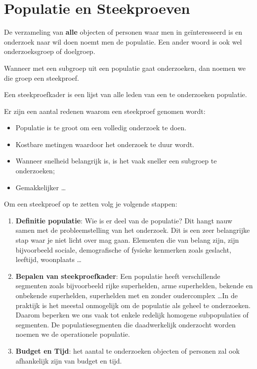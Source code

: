 \section{Populatie en Steekproeven}
\begin{definition}[Populatie]
  De verzameling van \textbf{alle} objecten of personen waar men in ge\"interesseerd is en onderzoek naar wil doen noemt men de  populatie. Een ander woord is ook wel onderzoeksgroep of doelgroep.
\end{definition}

\begin{definition}[Steekproef]
  Wanneer met een subgroep uit een populatie gaat onderzoeken, dan noemen we die groep een  steekproef.
\end{definition}

\begin{definition}[Steekproefkader]
  Een  steekproefkader is een lijst van alle leden van een te onderzoeken populatie.
\end{definition}

Er zijn een aantal redenen waarom een steekproef genomen wordt:
\begin{itemize}
  \item Populatie is te groot om een volledig onderzoek te doen.
  \item Kostbare metingen waardoor het onderzoek te duur wordt.
  \item Wanneer snelheid belangrijk is, is het vaak sneller een subgroep te onderzoeken;
  \item Gemakkelijker \dots
\end{itemize}

Om een steekproef op te zetten volg je volgende stappen:
\begin{enumerate}
  \item \textbf{Definitie populatie}: Wie is er deel van de populatie? Dit hangt nauw samen met de probleemstelling van het onderzoek. Dit is een zeer belangrijke stap waar je niet licht over mag gaan. Elementen die van belang zijn, zijn bijvoorbeeld sociale, demografische of fysieke kenmerken zoals geslacht, leeftijd, woonplaats \dots
  \item \textbf{Bepalen van steekproefkader}: Een populatie heeft verschillende segmenten zoals bijvoorbeeld rijke superhelden, arme superhelden, bekende en onbekende superhelden, superhelden met en zonder oudercomplex \dots In de praktijk is het meestal onmogelijk om de populatie als geheel te onderzoeken. Daarom beperken we ons vaak tot enkele redelijk homogene subpopulaties of segmenten. De populatiesegmenten die daadwerkelijk onderzocht worden noemen we de operationele populatie.
  \item \textbf{Budget en Tijd}: het aantal te onderzoeken objecten of personen zal ook afhankelijk zijn van budget en tijd.
\end{enumerate}



